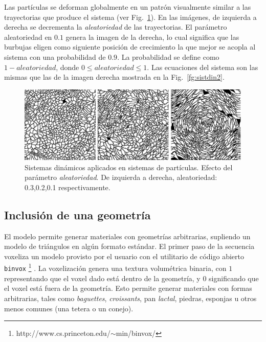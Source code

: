 Las part\'iculas se deforman globalmente en un patr\'on visualmente similar a las trayectorias que produce el sistema (ver Fig.~\ref{fg:sistdin3}).
En las im\'agenes, de izquierda a derecha se decrementa la {\em aleatoriedad} de las trayectorias.
El par\'ametro aleatoriedad en $0.1$ genera la imagen de la derecha, lo cual significa que las burbujas eligen como siguiente posición de crecimiento la que mejor se acopla al sistema con una probabilidad de $0.9$.
La probabilidad se define como $1-aleatoriedad$, donde $0 \leq aleatoriedad \leq 1$.
Las ecuaciones del sistema son las mismas que las de la imagen derecha mostrada en la Fig.~\ref{fg:sistdin2}.

\begin{figure}[htb!]
  \centerline{\includegraphics[width=12cm]{figures/Fig3}}
  \caption[Sistemas din\'amicos aplicados en sistemas de part\'iculas]{Sistemas din\'amicos aplicados en sistemas de part\'iculas. Efecto del parámetro {\em aleatoriedad}. De izquierda a derecha, aleatoriedad: 0.3,0.2,0.1 respectivamente. }
  \label{fg:sistdin3}
\end{figure}



\subsection{Inclusión de una geometría}

El modelo permite generar materiales con geometrías arbitrarias, supliendo un modelo de triángulos en algún formato estándar.
El primer paso de la secuencia voxeliza un modelo provisto por el usuario con el utilitario de código abierto {\tt binvox} \footnote{http://www.cs.princeton.edu/$\sim$min/binvox/} \cite{Nooruddin2003}.
La voxelización genera una textura volumétrica binaria, con $1$ representando que el voxel dado está dentro de la geometría, y $0$ significando que el voxel está fuera de la geometría.
Esto permite generar materiales con formas arbitrarias, tales como {\em baguettes}, {\em croissants}, pan {\em lactal}, piedras, esponjas u otros menos comunes (una tetera o un conejo).

